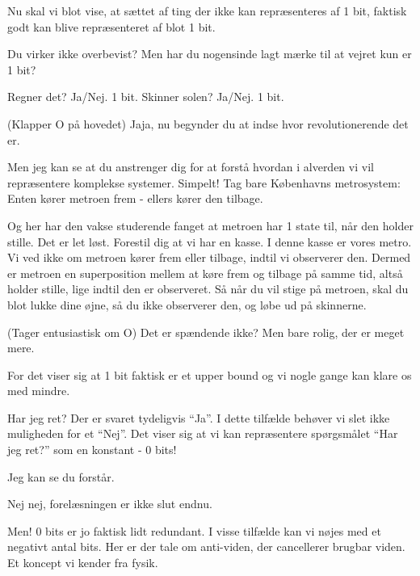 \documentclass[a4paper,11pt]{article}
\begin{document}
\begin{sketch}
Nu skal vi blot vise, at sættet af ting der ikke kan repræsenteres af 1 bit, faktisk godt kan blive repræsenteret af blot 1 bit.


Du virker ikke overbevist? Men har du nogensinde lagt mærke til at vejret kun er 1 bit?

Regner det? Ja/Nej. 1 bit.
Skinner solen? Ja/Nej. 1 bit.


(Klapper O på hovedet) Jaja, nu begynder du at indse hvor revolutionerende det er.

Men jeg kan se at du anstrenger dig for at forstå hvordan i alverden vi vil repræsentere komplekse systemer. Simpelt! Tag bare Københavns metrosystem:
Enten kører metroen frem - ellers kører den tilbage.

Og her har den vakse studerende fanget at metroen har 1 state til, når den holder stille. Det er let løst. Forestil dig at vi har en kasse. I denne kasse er vores metro. Vi ved ikke om metroen kører frem eller tilbage, indtil vi observerer den. Dermed er metroen en superposition mellem at køre frem og tilbage på samme tid, altså holder stille, lige indtil den er observeret. Så når du vil stige på metroen, skal du blot lukke dine øjne, så du ikke observerer den, og løbe ud på skinnerne.


 (Tager entusiastisk om O) Det er spændende ikke? Men bare rolig, der er meget mere.


 For det viser sig at 1 bit faktisk er et upper bound og vi nogle gange kan klare os med mindre.

Har jeg ret? Der er svaret tydeligvis “Ja”. I dette tilfælde behøver vi slet ikke muligheden for et “Nej”. Det viser sig at vi kan repræsentere spørgsmålet “Har jeg ret?” som en konstant - 0 bits!

Jeg kan se du forstår.

 Nej nej, forelæsningen er ikke slut endnu.

Men! 0 bits er jo faktisk lidt redundant. I visse tilfælde kan vi nøjes med et negativt antal bits.
Her er der tale om anti-viden, der cancellerer brugbar viden. Et koncept vi kender fra fysik.


\end{sketch}
\end{document}
